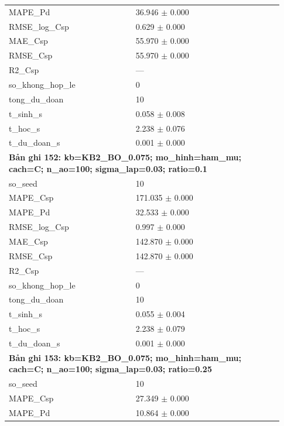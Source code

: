 \begin{longtable}{p{0.43\linewidth}p{0.50\linewidth}}
MAPE\_\allowbreak Pd & 36.946 $\pm$ 0.000 \\
RMSE\_\allowbreak log\_\allowbreak Csp & 0.629 $\pm$ 0.000 \\
MAE\_\allowbreak Csp & 55.970 $\pm$ 0.000 \\
RMSE\_\allowbreak Csp & 55.970 $\pm$ 0.000 \\
R2\_\allowbreak Csp & — \\
so\_\allowbreak khong\_\allowbreak hop\_\allowbreak le & 0 \\
tong\_\allowbreak du\_\allowbreak doan & 10 \\
t\_\allowbreak sinh\_\allowbreak s & 0.058 $\pm$ 0.008 \\
t\_\allowbreak hoc\_\allowbreak s & 2.238 $\pm$ 0.076 \\
t\_\allowbreak du\_\allowbreak doan\_\allowbreak s & 0.001 $\pm$ 0.000 \\
\midrule
\multicolumn{2}{p{0.95\linewidth}}{\textbf{Bản ghi 152: kb=KB2\_BO\_0.075; mo\_hinh=ham\_mu; cach=C; n\_ao=100; sigma\_lap=0.03; ratio=0.1}} \\
so\_\allowbreak seed & 10 \\
MAPE\_\allowbreak Csp & 171.035 $\pm$ 0.000 \\
MAPE\_\allowbreak Pd & 32.533 $\pm$ 0.000 \\
RMSE\_\allowbreak log\_\allowbreak Csp & 0.997 $\pm$ 0.000 \\
MAE\_\allowbreak Csp & 142.870 $\pm$ 0.000 \\
RMSE\_\allowbreak Csp & 142.870 $\pm$ 0.000 \\
R2\_\allowbreak Csp & — \\
so\_\allowbreak khong\_\allowbreak hop\_\allowbreak le & 0 \\
tong\_\allowbreak du\_\allowbreak doan & 10 \\
t\_\allowbreak sinh\_\allowbreak s & 0.055 $\pm$ 0.004 \\
t\_\allowbreak hoc\_\allowbreak s & 2.238 $\pm$ 0.079 \\
t\_\allowbreak du\_\allowbreak doan\_\allowbreak s & 0.001 $\pm$ 0.000 \\
\midrule
\multicolumn{2}{p{0.95\linewidth}}{\textbf{Bản ghi 153: kb=KB2\_BO\_0.075; mo\_hinh=ham\_mu; cach=C; n\_ao=100; sigma\_lap=0.03; ratio=0.25}} \\
so\_\allowbreak seed & 10 \\
MAPE\_\allowbreak Csp & 27.349 $\pm$ 0.000 \\
MAPE\_\allowbreak Pd & 10.864 $\pm$ 0.000 \\

\end{longtable}
